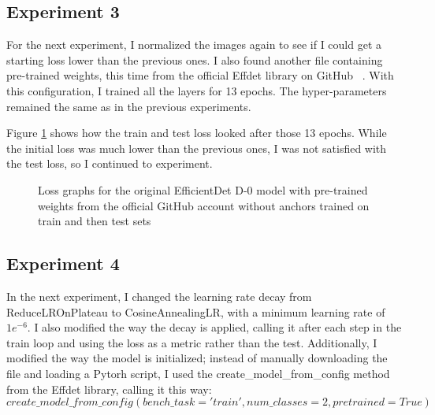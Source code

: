 \subsection{Experiment 3}

For the next experiment, I normalized the images again to see if I could get a starting loss lower than the previous ones. I also found another file containing pre-trained weights, this time from the official Effdet library on GitHub ~\cite{link7}. With this configuration, I trained all the layers for 13 epochs. The hyper-parameters remained the same as in the previous experiments. 

Figure \ref{fig:fig27} shows how the train and test loss looked after those 13 epochs. While the initial loss was much lower than the previous ones, I was not satisfied with the test loss, so I continued to experiment.

\begin{figure}[!ht]
    \label{fig:fig27}
    \caption{Loss graphs for the original EfficientDet D-0 model with pre-trained weights from the official GitHub account without anchors trained on train and then test sets}
\end{figure}

\subsection{Experiment 4}

In the next experiment, I changed the learning rate decay from ReduceLROnPlateau to CosineAnnealingLR, with a minimum learning rate of $1e^{-6}$. I also modified the way the decay is applied, calling it after each step in the train loop and using the loss as a metric rather than the test. Additionally, I modified the way the model is initialized; instead of manually downloading the file and loading a Pytorh script, I used the create\_model\_from\_config method from the Effdet library, calling it this way: \[
create\_model\_from\_config(bench\_task='train', num\_classes=2, pretrained=True)\]

